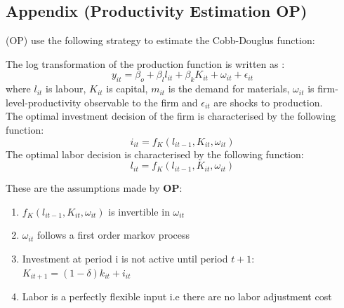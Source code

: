 \documentclass[11pt]{article}
\begin{document}
\subsection{Appendix (Productivity Estimation OP)}\label{prodest}
\label{op}

 \textcite{olley1992dynamics} (OP) use the
following strategy to estimate the Cobb-Douglus function: 


The log transformation of the production function is written as : 
\begin{equation}
y_{it} = \beta_{o} + \beta_{l}l_{it} + \beta_{k}K_{it} + \omega_{it} + \epsilon_{it} 
\end{equation}
where $l_{it}$ is labour, $K_{it}$ is capital, $m_{it}$  is
the demand for materials, $\omega_{it}$ is firm-level-productivity
observable to the firm and $\epsilon_{it}$ are shocks to production.\\
The optimal investment decision of the firm is characterised by the following
function:
\begin{equation}
i_{it}= f_{K}(l_{it-1}, K_{it}, \omega_{it})
\end{equation}
The optimal labor decision is characterised by the following function:
\begin{equation}
l_{it}= f_{K}(l_{it-1}, K_{it}, \omega_{it})
\end{equation}

These are the assumptions made by \textbf{OP}:
\begin{enumerate}
\item $f_{K}(l_{it-1}, K_{it}, \omega_{it})$ is invertible in
  $\omega_{it}$
\item $\omega_{it}$ follows a first order markov process 
\item Investment at period i is not active until period $t+1$:
  $K_{it+1}= (1-\delta)k_{it} + i_{it}$
\item Labor is a perfectly flexible input i.e there are no labor
  adjustment cost
\end{enumerate}
\end{document}
